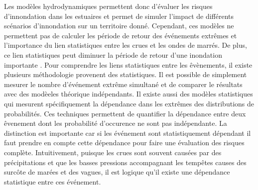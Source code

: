 \documentclass[12pt]{article}   %
\begin{document}
    Les modèles hydrodynamiques permettent donc d'évaluer les risques d'innondation dans les estuaires et permet de simuler l'impact de différents scénarios d'innondation sur un territoire donné. Cependant, ces modèles ne permettent pas de calculer les période de retour des événements extrêmes et l'importance du lien statistiques entre les crues et les ondes de marrés. De plus, ce lien statistiques peut diminuer la période de retour d'une inondation importante \cite{Moftakhari2017,Couasnon2018}. Pour comprendre les liens statistiques entre les êvènements, il existe plusieurs méthodologie provenent des statistiques. Il est possible de simplement mesurer le nombre d'événement extrême simultané et de comparer le résultats avec des modèeles théorique indépendants. Il existe aussi des modèles statistiques qui mesurent spécifiquement la dépendance dans les extrêmes des distributions de probabilités. Ces techniques permettent de quantifier la dépendance entre deux êvenement dont les probabilité d'occurence ne sont pas indépendante. La distinction est importante car si les événement sont statistiquement dépendant il faut prendre en compte cette dépendance pour faire une évaluation des risques complète. Intuitivement, puisque les crues sont souvent causées par des précipitations et que les basses pressions accompagnant les tempêtes causes des surcôte de marées et des vagues, il est logique qu'il existe une dépendance statistique entre ces événement.
    \par
\end{document}
